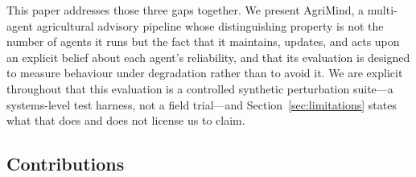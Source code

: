 \documentclass[preprint,12pt]{elsarticle}
\begin{document}
This paper addresses those three gaps together. We present AgriMind, a
multi-agent agricultural advisory pipeline whose distinguishing property is
not the number of agents it runs but the fact that it maintains, updates,
and acts upon an explicit belief about each agent's reliability, and that
its evaluation is designed to measure behaviour under degradation rather
than to avoid it. We are explicit throughout that this evaluation is a
controlled synthetic perturbation suite---a systems-level test harness,
not a field trial---and Section~\ref{sec:limitations} states what that
does and does not license us to claim.

\subsection*{Contributions}
\end{document}
